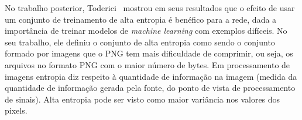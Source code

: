 No trabalho posterior, Toderici~\cite{FullResolution2017Toderici} mostrou em seus resultados que o efeito de usar um conjunto de treinamento de alta entropia é benéfico para a rede, dada a importância de treinar modelos de \textit{machine learning} com exemplos difíceis. No seu trabalho, ele definiu o conjunto de alta entropia como sendo o conjunto formado por imagens que o \acrshort{PNG} tem mais dificuldade de comprimir, ou seja, os arquivos no formato \acrshort{PNG} com o maior número de bytes. Em processamento de imagens entropia diz respeito à quantidade de informação na imagem (medida da quantidade de informação gerada pela fonte, do ponto de vista de processamento de sinais). Alta entropia pode ser visto como maior variância nos valores dos pixels.


